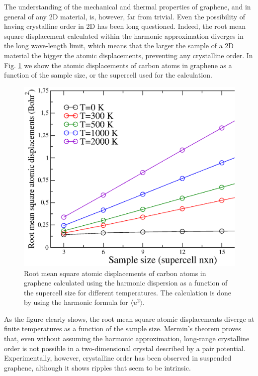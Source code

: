 The understanding of the mechanical and thermal properties of graphene, and in general of any 2D material, 
is, however, far from trivial. Even the possibility of having crystalline order in 2D has been long 
questioned\cite{landau_statistical_physics,mermin1968crystalline}. Indeed, the root mean square displacement 
calculated within the harmonic approximation diverges in the long wave-length limit, which means that the larger the 
sample of a 2D material the bigger the atomic displacements, preventing any crystalline 
order\cite{landau_statistical_physics}. In Fig. \ref{rms_harmonic} we show the atomic displacements of carbon atoms 
in graphene as a function of the sample size, or the supercell used for the calculation.
\begin{figure}[h]
\includegraphics[width=0.8\linewidth]{Figures/rms-harmonic.eps}
\caption[Root mean square atomic displacements of carbon atoms in graphene calculated using the harmonic 
	dispersion]{Root mean square atomic displacements of carbon atoms in graphene calculated using the harmonic 
	dispersion as a function of the supercell size for different temperatures. The calculation is done by using 
	the harmonic formula for $\langle u^{2}\rangle$\cite{ashcroft1976solid}.}
\label{rms_harmonic}
\end{figure}
As the figure clearly shows, the root mean square atomic displacements diverge at finite temperatures as a function 
of the sample size. Mermin's theorem\cite{mermin1968crystalline} proves that, even without assuming the harmonic 
approximation, long-range crystalline order is not possible in a two-dimensional crystal described by a pair 
potential. Experimentally, however, crystalline order has been observed in suspended 
graphene\cite{meyer2007structure}, although it shows ripples that seem to be intrinsic\cite{fasolino2007intrinsic}. \\

